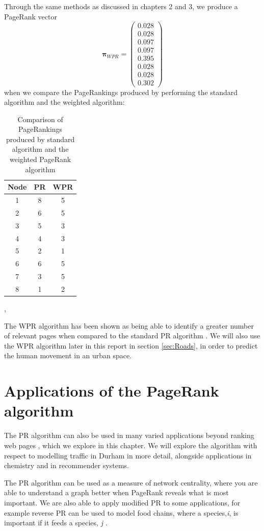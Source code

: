\documentclass[11pt]{report}
\begin{document}
{Through the same methods as discussed in chapters 2 and 3, we produce a PageRank vector 
\[\boldsymbol\pi_{WPR} = \left(
\begin{array}{c}
0.028 \\
0.028 \\
0.097 \\
0.097 \\
0.395 \\
0.028 \\
0.028 \\
0.302
\end{array}
\right)\]
when we compare the PageRankings produced by performing the standard algorithm and the weighted algorithm:
\begin{table}[H] \caption{Comparison of PageRankings produced by standard algorithm and the weighted PageRank algorithm}
 \centering
 \begin{tabular} {c| c c} 
 Node & PR & WPR \\ [0.5ex] 
 \hline
 1&8&5\\
 2&6&5\\
 3&5&3\\
 4&4&3\\
 5&2&1\\
 6&6&5\\
 7&3&5\\
 8&1&2\\
 \end{tabular}
 \label{Table:WPR and PR}
\end{table}
\cite{langville}, \cite{baeza2004web}

The WPR algorithm has been shown as being able to identify a greater number of relevant pages when compared to the standard PR algorithm \cite{xing2004weighted}. We will also use the WPR algorithm later in this report in section \ref{sec:Roads}, in order to predict the human movement in an urban space. 


\chapter{Applications of the PageRank algorithm} \label{chap:Applications}
The PR algorithm can also be used in many varied applications beyond ranking web pages \cite{gleich2015pagerank}, which we explore in this chapter. We will explore the algorithm with respect to modelling traffic in Durham in more detail, alongside applications in chemistry and in recommender systems. 

The PR algorithm can be used as a measure of network centrality, where you are able to understand a graph better when PageRank reveals what is most important. We are also able to apply modified PR to some applications, for example reverse PR can be used to model food chains, where a species,\textit{i}, is important if it feeds a species, \textit{j} \cite{allesina2009googling}. 

}
\end{document}
